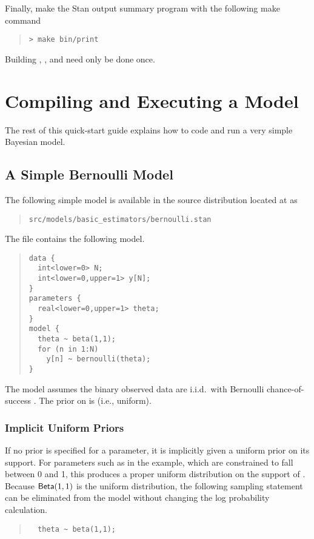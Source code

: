 Finally, make the Stan output summary program with the following
make command
%
\begin{quote}
\begin{Verbatim}[fontshape=sl]
> make bin/print
\end{Verbatim}
\end{quote}
%

Building , , and  need only be done once.

\section{Compiling and Executing a Model}\label{compiling-model.section}

The rest of this quick-start guide explains how to code
and run a very simple Bayesian model.

\subsection{A Simple Bernoulli Model}

The following simple model is available in the source
distribution located at  as
%
\begin{quote}
\nolinkurl{src/models/basic_estimators/bernoulli.stan}
\end{quote}
%
The file contains the following model.
%
\begin{quote}
\begin{Verbatim}
data { 
  int<lower=0> N; 
  int<lower=0,upper=1> y[N];
} 
parameters {
  real<lower=0,upper=1> theta;
} 
model {
  theta ~ beta(1,1);
  for (n in 1:N) 
    y[n] ~ bernoulli(theta);
}
\end{Verbatim}
\end{quote}
%
The model assumes the binary observed data 
are i.i.d.\ with Bernoulli chance-of-success .  The
prior on  is  (i.e., uniform).

\subsubsection{Implicit Uniform Priors}

If no prior is specified for a parameter, it is implicitly given a
uniform prior on its support.  For parameters such as  in
the example, which are constrained to fall between 0 and 1, this
produces a proper uniform distribution on the support of .
Because $\distro{Beta}(1,1)$ is the uniform distribution, the
following sampling statement can be eliminated from the model without
changing the log probability calculation.
%
\begin{quote}
\begin{Verbatim}
  theta ~ beta(1,1);
\end{Verbatim}
\end{quote}


